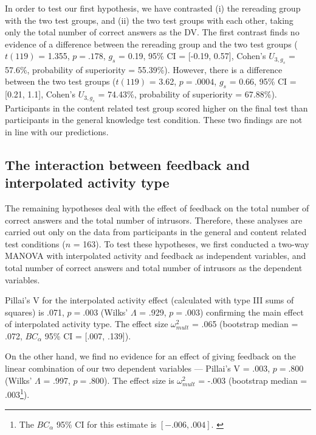 \documentclass[../main.tex]{subfiles}
\begin{document}
In order to test our first hypothesis, we have contrasted (i) the
rereading group with the two test groups, and (ii) the two test groups
with each other, taking only the total number of correct answers as the
DV. The first contrast finds no evidence of a difference between the
rereading group and the two test groups (\(t(119)\) = 1.355,
\(p = .178\), \(g_s\) = 0.19, 95\% CI = {[}-0.19, 0.57{]}, Cohen's
\(U_{3, g_s}\) = 57.6\%, probability of superiority = 55.39\%). However,
there is a difference between the two test groups (\(t(119)\) = 3.62,
\(p = .0004\), \(g_s\) = 0.66, 95\% CI = {[}0.21, 1.1{]}, Cohen's
\(U_{3, g_s}\) = 74.43\%, probability of superiority = 67.88\%).
Participants in the content related test group scored higher on the
final test than participants in the general knowledge test condition.
These two findings are not in line with our predictions.

\hypertarget{the-interaction-between-feedback-and-interpolated-activity-type}{%
\subsection{The interaction between feedback and interpolated activity
type}\label{the-interaction-between-feedback-and-interpolated-activity-type}}

The remaining hypotheses deal with the effect of feedback on the total
number of correct answers and the total number of intrusors. Therefore,
these analyses are carried out only on the data from participants in the
general and content related test conditions (\(n\) = 163). To test these
hypotheses, we first conducted a two-way MANOVA with interpolated
activity and feedback as independent variables, and total number of
correct answers and total number of intrusors as the dependent
variables.

Pillai's V for the interpolated activity effect (calculated with type
III sums of squares) is .071, \(p = .003\) (Wilks' \(\Lambda\) = .929,
\(p = .003\)) confirming the main effect of interpolated activity type.
The effect size \(\omega^2_{mult}\) = .065 (bootstrap median = .072,
\(BC_\alpha\) 95\% CI = {[}.007, .139{]}).

On the other hand, we find no evidence for an effect of giving feedback
on the linear combination of our two dependent variables --- Pillai's V
= .003, \(p = .800\) (Wilks' \(\Lambda\) = .997, \(p = .800\)). The
effect size is \(\omega^2_{mult}\) = -.003 (bootstrap median =
.003\footnote{
The \(BC_\alpha\) 95\% CI for this estimate is \([-.006,
.004]\).
\label{bca-ref}}).
\end{document}
